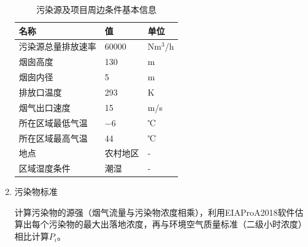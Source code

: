 \begin{enumerate}
    \begin{table}[H]
        \centering
        \caption{污染源及项目周边条件基本信息}
        \begin{tabular}{p{}p{}p{}}
            \toprule
            名称 & 值 & 单位 \\
            \midrule
            污染源总量排放速率 & 60000 & Nm$^3$/h \\
            烟囱高度 & 130 & m \\
            烟囱内径 & 5 & m \\
            排放口温度 & 293 & K \\
            烟气出口速度 & 15 & m/s \\
            所在区域最低气温 & $-6$ & ℃ \\
            所在区域最高气温 & 44 & ℃ \\
            \midrule
            地点 & 农村地区 & - \\
            区域湿度条件 & 潮湿 & - \\
            \bottomrule
        \end{tabular}
        \label{tab:Basic information on pollution sources and surrounding conditions of the project}
    \end{table}

    \item 污染物标准
    
    计算污染物的源强（烟气流量与污染物浓度相乘），利用EIAProA2018软件估算出每个污染物的最大出落地浓度，再与环境空气质量标准（二级小时浓度）相比计算$P_i$。
    \begin{table}[H]
        \centering
        \caption{污染物排放值}
        \label{tab:Pollutant emission value}%
    \end{table}%


\end{enumerate}
